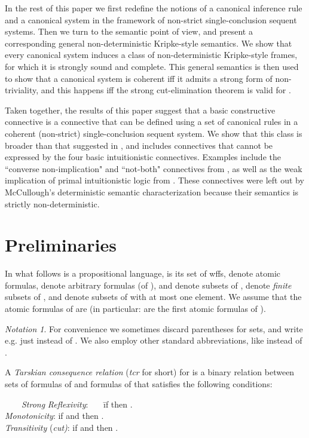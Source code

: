 \documentclass{LMCS}
\theoremstyle{remark}
\newtheorem*{notation}{Notation}
\begin{document}
In the rest of this paper 
we first redefine the notions of a canonical inference rule and a canonical
system in the framework of non-strict single-conclusion sequent systems.
Then we turn to the semantic point of view, and 
present a corresponding general non-deterministic Kripke-style semantics.
We show that every canonical system 
induces a class of non-deterministic Kripke-style frames,
for which it is strongly sound and complete. 
This general semantics is then used  to show that a   canonical system
 is coherent iff it admits a strong form of non-triviality, and this happens
iff the strong  cut-elimination theorem is valid for .



Taken together, the results of this paper suggest that a basic constructive connective
is a connective that can be defined using a set of canonical rules
in a coherent (non-strict) single-conclusion sequent system.
We show that this class is broader than that suggested in \cite{McCullough},
and includes connectives that cannot be expressed by the four basic intuitionistic connectives.
Examples include the 
``converse non-implication" and ``not-both" connectives from \cite{Bowen}, 
as well as the weak implication of primal intuitionistic logic from \cite{gu09}.
These connectives were left out by McCullough's deterministic semantic characterization
because their semantics is strictly non-deterministic.


\section{Preliminaries}

In what follows   is a propositional language,
 is its set of wffs,
 denote atomic formulas,
 denote arbitrary formulas  (of ),
 and  denote subsets of ,
 denote {\em finite} subsets of ,
and  denote subsets of  with at most one element.
We assume that the atomic formulas of 
are  (in particular:
 are the first  atomic formulas of ).

\begin{notation}
For convenience we sometimes discard  parentheses for sets,
and write e.g. just  instead of .
We also employ other standard abbreviations, like
 instead of .
\end{notation}

\begin{defi}
\label{tcr}
A {\em Tarskian consequence relation} ({\em tcr} for short) for 
is a binary relation  between sets of formulas of  and formulas of 
that satisfies the following conditions:
\begin{tabbing}
\ \ \ \ \=
 {\it Strong} {\it Reflexivity}: \ \ \ \=
if  then .\\
 \> {\it Monotonicity}: \> if  and
 then . \\
 \> {\it Transitivity} {(\it cut)}:
\> if  and 
then .
\end{tabbing}
\end{defi}
\end{document}
